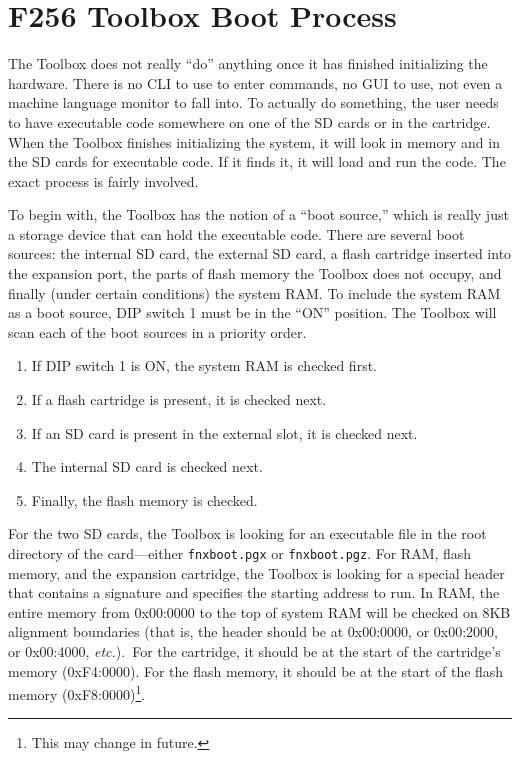 \chapter{F256 Toolbox Boot Process}
The Toolbox does not really ``do'' anything once it has finished initializing the hardware.
There is no CLI to use to enter commands, no GUI to use, not even a machine language monitor to fall into.
To actually do something, the user needs to have executable code somewhere on one of the SD cards or in
the cartridge.
When the Toolbox finishes initializing the system, it will look in memory and in the SD cards for executable
code. If it finds it, it will load and run the code. The exact process is fairly involved.

To begin with, the Toolbox has the notion of a ``boot source,'' which is really just a storage device that can
hold the executable code. There are several boot sources: the internal SD card, the external SD card, a flash
cartridge inserted into the expansion port, the parts of flash memory the Toolbox does not occupy, and finally
(under certain conditions) the system RAM. To include the system RAM as a boot source, DIP switch 1 must be in
the ``ON'' position. The Toolbox will scan each of the boot sources in a priority order.

\begin{enumerate}
	\item If DIP switch 1 is ON, the system RAM is checked first.
	\item If a flash cartridge is present, it is checked next.
	\item If an SD card is present in the external slot, it is checked next.
	\item The internal SD card is checked next.
	\item Finally, the flash memory is checked.
\end{enumerate}

For the two SD cards, the Toolbox is looking for an executable file in the root directory of the card---either \verb+fnxboot.pgx+
or \verb+fnxboot.pgz+. For RAM, flash memory, and the expansion cartridge, the Toolbox is looking for a special header that contains
a signature and specifies the starting address to run.
In RAM, the entire memory from 0x00:0000 to the top of system RAM will be checked on 8KB alignment boundaries
(that is, the header should be at 0x00:0000, or 0x00:2000, or 0x00:4000, {\it etc.}).\
For the cartridge, it should be at the start of the cartridge's memory (0xF4:0000). For the flash memory, it should be at the start of the flash memory (0xF8:0000)\footnote{This may change in future.}.

